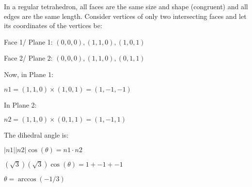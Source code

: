 \documentclass[titlepage,12pt]{book}
\begin{document}
\mainmatter

\begin{solution}
    In a regular tetrahedron, all faces are the same size and shape (congruent) and all edges are the same length.
    Consider vertices of only two intersecting faces and let its coordinates of the vertices be:

    Face 1/ Plane 1: $(0,0,0), (1, 1, 0), (1, 0, 1)$

    Face 2/ Plane 2: $(0,0,0), (1, 1, 0), (0, 1, 1)$
    

    Now, in Plane 1:
    
    $n1 = (1, 1, 0) \times (1, 0, 1) = (1, -1, -1)$


    In Plane 2:

    $n2 = (1, 1, 0) \times (0, 1, 1) = (1, -1, 1)$

    The dihedral angle is:

    $|n1||n2| \cos(\theta) = n1 \cdot n2$
    
    $(\sqrt{3}) (\sqrt{3}) \cos(\theta) =  1 + -1 + -1$

    $\theta = \arccos(-1/3)$
\end{solution}


\begin{solution}
\end{solution}
\end{document}
